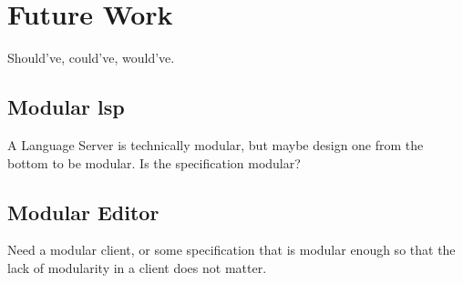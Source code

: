 \chapter{Future Work}

Should've, could've, would've.

\section{Modular \gls{lsp}}

A Language Server is technically modular, but maybe design one from the bottom
to be modular. Is the specification modular?

\section{Modular Editor}

Need a modular client, or some specification that is modular enough so that the
lack of modularity in a client does not matter.
